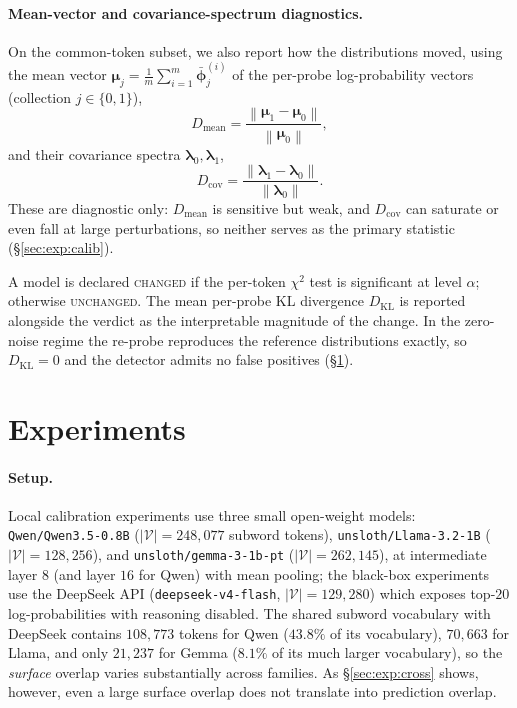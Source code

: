 \documentclass[11pt]{article}
\newcommand{\V}{\mathcal{V}}
\newcommand{\norm}[1]{\left\lVert #1 \right\rVert}
\theoremstyle{definition}
\begin{document}
\paragraph{Mean-vector and covariance-spectrum diagnostics.}
On the common-token subset, we also report how the distributions moved, using
the mean vector $\bm{\mu}_j = \tfrac1m \sum_{i=1}^m \bar{\bm{\phi}}^{(i)}_j$ of
the per-probe log-probability vectors (collection $j \in \{0,1\}$),
\begin{equation}
  D_{\mathrm{mean}} = \frac{\norm{\bm{\mu}_1 - \bm{\mu}_0}}{\norm{\bm{\mu}_0}} ,
  \label{eq:dmean}
\end{equation}
and their covariance spectra $\bm{\lambda}_0, \bm{\lambda}_1$,
\begin{equation}
  D_{\mathrm{cov}} = \frac{\norm{\bm{\lambda}_1 - \bm{\lambda}_0}}{\norm{\bm{\lambda}_0}} .
  \label{eq:dcov}
\end{equation}
These are diagnostic only: $D_{\mathrm{mean}}$ is sensitive but weak, and
$D_{\mathrm{cov}}$ can saturate or even fall at large perturbations, so neither
serves as the primary statistic (\S\ref{sec:exp:calib}).

A model is declared \textsc{changed} if the per-token $\chi^2$ test is
significant at level $\alpha$; otherwise \textsc{unchanged}. The mean per-probe
KL divergence $D_{\mathrm{KL}}$ is reported alongside the verdict as the
interpretable magnitude of the change. In the zero-noise regime the re-probe
reproduces the reference distributions exactly, so $D_{\mathrm{KL}} = 0$ and
the detector admits no false positives (\S\ref{sec:exp}).

\section{Experiments}
\label{sec:exp}

\paragraph{Setup.}
Local calibration experiments use three small open-weight models:
\texttt{Qwen\slash Qwen3.5-0.8B} ($|\V|=248{,}077$ subword tokens),
\texttt{unsloth\slash Llama-3.2-1B} ($|\V|=128{,}256$), and
\texttt{unsloth\slash gemma-3-1b-pt} ($|\V|=262{,}145$), at intermediate
layer $8$ (and layer $16$ for Qwen) with mean pooling; the black-box
experiments use the DeepSeek API (\texttt{deepseek-v4-flash}, $|\V|=129{,}280$)
which exposes
top-$20$ log-probabilities with reasoning disabled. The shared subword
vocabulary with DeepSeek contains $108{,}773$ tokens for Qwen ($43.8\%$ of its
vocabulary), $70{,}663$ for Llama, and only $21{,}237$ for Gemma ($8.1\%$ of
its much larger vocabulary), so the \emph{surface} overlap varies
substantially across families. As \S\ref{sec:exp:cross} shows, however, even a
large surface overlap does not translate into prediction overlap.
\end{document}
